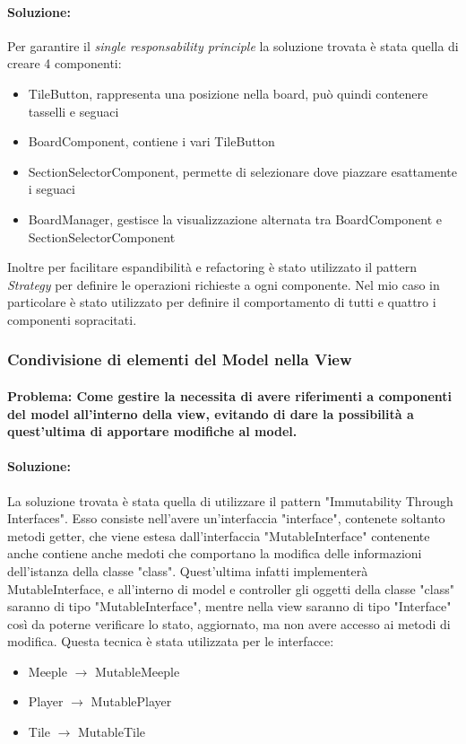 \paragraph{Soluzione:}
Per garantire il \textit{single responsability principle} la soluzione trovata è stata quella di creare 4 componenti:
\begin{itemize}
    \item TileButton, rappresenta una posizione nella board, può quindi contenere tasselli e seguaci
    \item BoardComponent, contiene i vari TileButton
    \item SectionSelectorComponent, permette di selezionare dove piazzare esattamente i seguaci
    \item BoardManager, gestisce la visualizzazione alternata tra BoardComponent e SectionSelectorComponent
\end{itemize}
Inoltre per facilitare espandibilità e refactoring è stato utilizzato il pattern \textit{Strategy} per definire le operazioni richieste a ogni componente. Nel mio caso in particolare è stato utilizzato per definire il comportamento di tutti e quattro i componenti sopracitati.

\subsubsection*{Condivisione di elementi del Model nella View}
\paragraph{Problema: Come gestire la necessita di avere riferimenti a componenti del model all'interno della view, evitando di dare la possibilità a quest'ultima di apportare modifiche al model.}
\paragraph{Soluzione:}
La soluzione trovata è stata quella di utilizzare il pattern "Immutability Through Interfaces". Esso consiste nell'avere un'interfaccia "interface", contenete soltanto metodi getter, che viene estesa dall'interfaccia "MutableInterface" contenente anche contiene anche medoti che comportano la modifica delle informazioni dell'istanza della classe "class". Quest'ultima infatti implementerà MutableInterface, e all'interno di model e controller gli oggetti della classe "class" saranno di tipo "MutableInterface", mentre nella view saranno di tipo "Interface" così da poterne verificare lo stato, aggiornato, ma non avere accesso ai metodi di modifica.
Questa tecnica è stata utilizzata per le interfacce:
\begin{itemize}
    \item Meeple $\rightarrow$ MutableMeeple
    \item Player $\rightarrow$ MutablePlayer
    \item Tile $\rightarrow$ MutableTile
\end{itemize}

